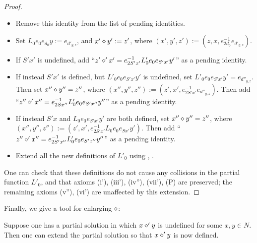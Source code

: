 \begin{proof}
\begin{itemize}
\item Remove this identity from the list of pending identities.
\item Set $L_0 e_0 e_{d_0} y := e_{d'_{y,z}}$, and $x' \diamond y' := z'$, where $(x',y',z') := (z, x, e_{2d_0}^{-1} e_{d'_{y,z}})$.
\item If $S'x'$ is undefined, add ``$z' \diamond' x' = e_{2S'x'}^{-1} L'_0 e_0 e_{S'x'} y'$'' as a pending identity.
\item If instead $S'x'$ is defined, but $L'_0 e_0 e_{S'x'} y'$ is undefined, set $L'_0 e_0 e_{S'x'} y' = e_{d''_{y,z}}$.  Then set $x'' \diamond y'' = z''$, where $(x'',y'',z'') := (z', x', e_{2S'x'}^{-1} e_{d''_{y,z}})$.  Then add ``$z'' \diamond' x'' = e_{2Sx''}^{-1} L'_0 e_0 e_{S'x''} y''$'' as a pending identity.
\item If instead $S' x$ and $L_0 e_0 e_{S'x'} y'$ are both defined, set $x'' \diamond y'' = z''$, where $(x'',y'',z'') := (z', x', e_{2S'x'}^{-1} L_0 e_0 e_{Sx'} y')$.  Then add ``$z'' \diamond' x'' = e_{2S'x''}^{-1} L'_0 e_0 e_{S'x''} y''$'' as a pending identity.
\item Extend all the new definitions of $L'_0$ using , .
\end{itemize}
One can check that these definitions do not cause any collisions in the partial function $L'_0$, and that axioms (i'), (iii'), (iv''), (vii'), (P) are preserved; the remaining axioms (v''), (vi') are unaffected by this extension.
\end{proof}

Finally, we give a tool for enlarging $\op$:

\begin{proposition}[Enlarging $\op$]\label{enlarge-op}  Suppose one has a partial solution in which $x \diamond' y$ is undefined for some $x,y \in N$.  Then one can extend the partial solution so that $x \diamond' y$ is now defined.
\end{proposition}

